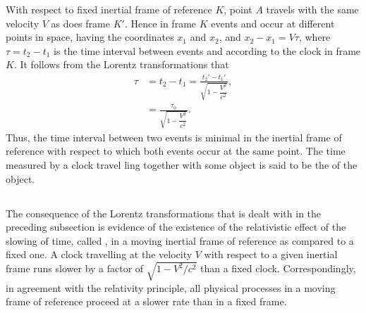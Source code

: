 With respect to fixed inertial frame of reference $K$, point $A$ travels with the same velocity $V$ as does frame $K'$. Hence in frame $K$ events  and  occur at different points in space, having the coordinates $x_{1}$ and $x_{2}$, and $x_{2} - x_{1} = V \tau$, where $\tau = t_{2}- t_{1}$ is the time interval between events  and  according to the clock in frame $K$. It follows from the Lorentz transformations that
\begin{align*}%
\tau & = t_{2} - t_{1} =\frac{t_{2}'-t_{1}'}{\sqrt{1 - \dfrac{V^{2}}{c^{2}}}}, \\
& =\frac{\tau_{0}}{\sqrt{1 - \dfrac{V^{2}}{c^{2}}}}.
\end{align*}
Thus, the time interval between two events is minimal in the inertial frame of reference with respect to which both events occur at the same point. The time measured by a clock travel­ ling together with some object is said to be the  of the object.

\subsection{}\label{5.4.5} The consequence of the Lorentz transformations that is dealt with in the preceding subsection is evidence of the existence of the relativistic effect of the slowing of time, called , in a moving inertial frame of reference as compared to a fixed one. A clock travelling at the velocity $V$ with respect to a given inertial frame runs slower by a factor of $\sqrt{1 - V^{2}/c^{2}}$ than a fixed clock. Correspondingly, in agreement with the relativity principle, all physical processes in a moving frame of reference proceed at a slower rate than in a fixed frame.

